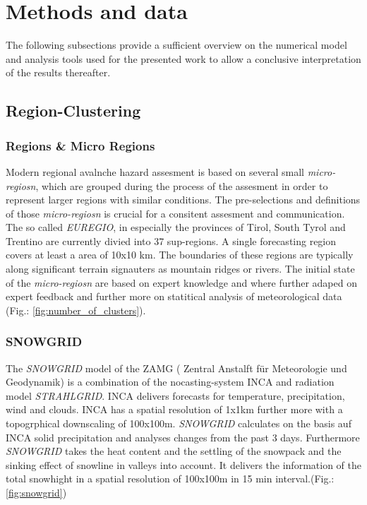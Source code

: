 \chapter{Methods and data}

The following subsections provide a sufficient overview on the numerical model and analysis tools used for the presented work to allow a conclusive interpretation of the results thereafter.

\section{Region-Clustering} 
\label{sec:region_clustering}

\subsection{Regions \& Micro Regions}

Modern regional avalnche hazard assesment is based on several small \textit{micro-regiosn}, 
which are grouped during the process of the assesment in order to represent larger regions with similar conditions.
The pre-selections and definitions of those \textit{micro-regiosn} is crucial for a consitent assesment and
communication. The so called \textit{EUREGIO}, in especially the provinces of Tirol, South Tyrol and Trentino are 
currently divied into 37 sup-regions. A single forecasting region covers at least a area of 10x10 km.
The boundaries of these regions are typically along significant terrain signauters as mountain ridges or rivers.
The initial state of the \textit{micro-regiosn} are based on expert knowledge and where further adaped on 
expert feedback and further more on statitical analysis of meteorological data (Fig.: \ref{fig:number_of_clusters}).




\subsection{SNOWGRID}
The \textit{SNOWGRID} model of the ZAMG ( Zentral Anstalft für Meteorologie und Geodynamik)
 is a combination of the nocasting-system INCA and radiation model \textit{STRAHLGRID}. INCA delivers forecasts for
 temperature, precipitation, wind and clouds. INCA has a spatial resolution of 1x1km further more with a topogrphical
 downscaling of 100x100m. \textit{SNOWGRID} calculates on the basis auf INCA solid precipitation
 and analyses changes from the past 3 days. Furthermore \textit{SNOWGRID} takes the heat content and the settling of 
 the snowpack and the sinking effect of snowline in valleys into account. It delivers the information of the total
 snowhight in a spatial resolution of 100x100m in 15 min interval.(Fig.: \ref{fig:snowgrid})

